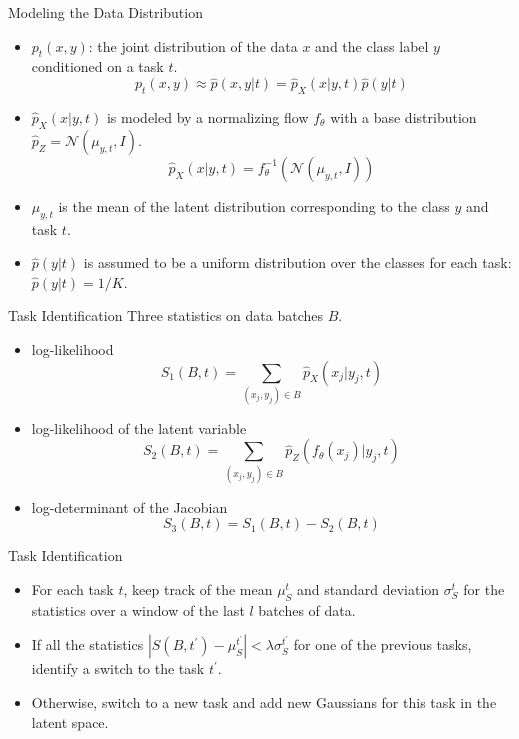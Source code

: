 \documentclass{beamer}
\begin{document}
\begin{frame}{Modeling the Data Distribution}
  \begin{itemize}
    \item <1-> $p_t(x, y)$: the joint distribution of the data $x$ and the class label $y$ conditioned on a task $t$.
    \[
      p_t(x, y) \approx \hat{p}(x, y | t) = \hat{p}_X(x | y, t) \hat{p}(y | t)
    \]
    \item <1-> $\hat{p}_X(x | y, t)$ is modeled by a normalizing flow $f_\theta$ with a base distribution $\hat{p}_Z = \mathcal{N}(\mu_{y, t}, I)$.
    \[
      \hat{p}_X(x | y, t) = f_\theta^{-1}\left( \mathcal{N}(\mu_{y, t}, I) \right)
    \]
    \item <1-> $\mu_{y, t}$ is the mean of the latent distribution corresponding to the class $y$ and task $t$.
    \item <1-> $\hat{p}(y | t)$ is assumed to be a uniform distribution over the classes for each task: $\hat{p}(y | t) = 1/K$.
  \end{itemize}
\end{frame}

\begin{frame}{Task Identification}
  Three statistics on data batches $B$.
  \begin{itemize}
    \item <1-> log-likelihood
    \[
      S_1(B, t) = \sum_{(x_j, y_j) \in B} \hat{p}_X(x_j | y_j, t)
    \]
    \item <1-> log-likelihood of the latent variable 
    \[
      S_2(B, t) = \sum_{(x_j, y_j) \in B} \hat{p}_Z(f_\theta(x_j) | y_j, t)
    \]
    \item <1-> log-determinant of the Jacobian
    \[
      S_3(B, t) = S_1(B, t) - S_2(B, t)
    \]
  \end{itemize}
\end{frame}

\begin{frame}{Task Identification}
  \begin{itemize}
    \item <1-> For each task $t$, keep track of the mean $\mu_S^t$ and standard deviation $\sigma_S^t$ for the statistics over a window of the last $l$ batches of data.
    \item <1-> If all the statistics $|S(B, t^\prime) - \mu_S^{t^\prime}| < \lambda \sigma_S^{t^\prime}$ for one of the previous tasks, identify a switch to the task $t^\prime$.
    \item <1-> Otherwise, switch to a new task and add new Gaussians for this task in the latent space.
  \end{itemize}
\end{frame} 
\end{document}
